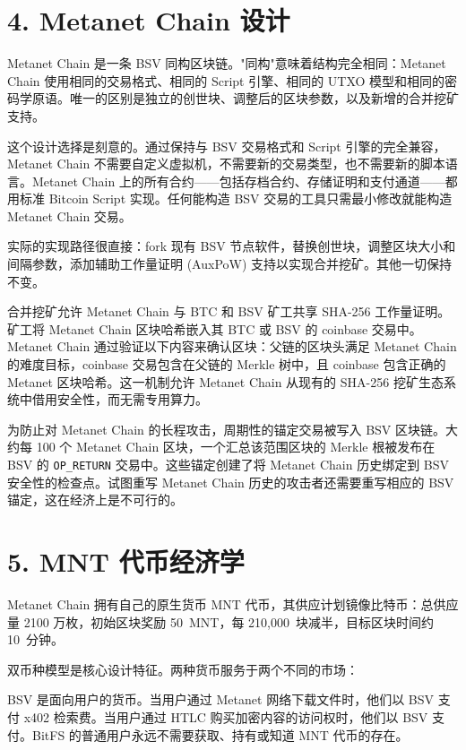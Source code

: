 \documentclass[11pt,a4paper]{article}
\begin{document}
\section{4. Metanet Chain 设计}

Metanet Chain 是一条 BSV 同构区块链。"同构"意味着结构完全相同：Metanet Chain 使用相同的交易格式、相同的 Script 引擎、相同的 UTXO 模型和相同的密码学原语。唯一的区别是独立的创世块、调整后的区块参数，以及新增的合并挖矿支持。

这个设计选择是刻意的。通过保持与 BSV 交易格式和 Script 引擎的完全兼容，Metanet Chain 不需要自定义虚拟机，不需要新的交易类型，也不需要新的脚本语言。Metanet Chain 上的所有合约——包括存档合约、存储证明和支付通道——都用标准 Bitcoin Script 实现。任何能构造 BSV 交易的工具只需最小修改就能构造 Metanet Chain 交易。

实际的实现路径很直接：fork 现有 BSV 节点软件，替换创世块，调整区块大小和间隔参数，添加辅助工作量证明 (AuxPoW) 支持以实现合并挖矿。其他一切保持不变。

合并挖矿允许 Metanet Chain 与 BTC 和 BSV 矿工共享 SHA-256 工作量证明。矿工将 Metanet Chain 区块哈希嵌入其 BTC 或 BSV 的 coinbase 交易中。Metanet Chain 通过验证以下内容来确认区块：父链的区块头满足 Metanet Chain 的难度目标，coinbase 交易包含在父链的 Merkle 树中，且 coinbase 包含正确的 Metanet 区块哈希。这一机制允许 Metanet Chain 从现有的 SHA-256 挖矿生态系统中借用安全性，而无需专用算力。

为防止对 Metanet Chain 的长程攻击，周期性的锚定交易被写入 BSV 区块链。大约每 100 个 Metanet Chain 区块，一个汇总该范围区块的 Merkle 根被发布在 BSV 的 \texttt{OP\_RETURN} 交易中。这些锚定创建了将 Metanet Chain 历史绑定到 BSV 安全性的检查点。试图重写 Metanet Chain 历史的攻击者还需要重写相应的 BSV 锚定，这在经济上是不可行的。

\section{5. MNT 代币经济学}

Metanet Chain 拥有自己的原生货币 MNT 代币，其供应计划镜像比特币：总供应量 2100 万枚，初始区块奖励 50~MNT，每 210,000~块减半，目标区块时间约 10~分钟。

双币种模型是核心设计特征。两种货币服务于两个不同的市场：

BSV 是面向用户的货币。当用户通过 Metanet 网络下载文件时，他们以 BSV 支付 x402 检索费。当用户通过 HTLC 购买加密内容的访问权时，他们以 BSV 支付。BitFS 的普通用户永远不需要获取、持有或知道 MNT 代币的存在。
\end{document}

